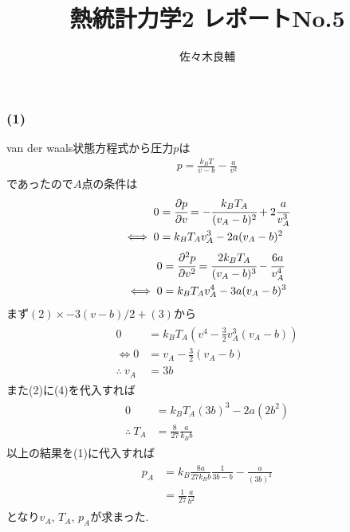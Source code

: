 \documentclass[uplatex,a4j,11pt,dvipdfmx]{jsarticle}
\begin{document}
\title{熱統計力学2 レポートNo.5}
\author{佐々木良輔}
\date{}
\maketitle
\subsubsection*{(1)}
van der waals状態方程式から圧力$p$は
\begin{align}
  p=\frac{k_BT}{v-b}-\frac{a}{v^2}
\end{align}
であったので$A$点の条件は
\begin{align}
  \begin{split}
    0&=\cfrac{\partial p}{\partial v}=-\cfrac{k_BT_A}{(v_A-b)^2}+2\cfrac{a}{v_A^3}\\
    \iff
    0&=k_BT_Av_A^3-2a(v_A-b)^2
  \end{split}
\end{align}
\begin{align}
  \begin{split}
    0&=\cfrac{\partial^2 p}{\partial v^2}=\cfrac{2k_BT_A}{(v_A-b)^3}-\cfrac{6a}{v_A^4}\\
    \iff
    0&=k_BT_Av_A^4-3a(v_A-b)^3
  \end{split}
\end{align}
まず$(2)\times-3(v-b)/2+(3)$から
\begin{align}
  \begin{split}
    0&=k_BT_A(v^4-\frac{3}{2}v_A^3(v_A-b))\\
    \iff
    0&=v_A-\frac{3}{2}(v_A-b)\\
    \therefore\ 
    v_A&=3b
  \end{split}
\end{align}
また(2)に(4)を代入すれば
\begin{align}
  \begin{split}
    0&=k_BT_A(3b)^3-2a(2b^2)\\
    \therefore\ 
    T_A&=\frac{8}{27}\frac{a}{k_Bb}    
  \end{split}
\end{align}
以上の結果を(1)に代入すれば
\begin{align}
  \begin{split}
    p_A&=k_B\frac{8a}{27k_Bb}\frac{1}{3b-b}-\frac{a}{(3b)^2}\\
    &=\frac{1}{27}\frac{a}{b^2}
  \end{split}
\end{align}
となり$v_A$, $T_A$, $p_A$が求まった.
\end{document}

